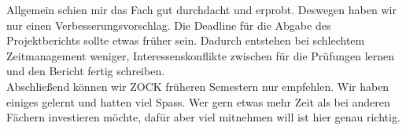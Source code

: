 \documentclass[12pt,a4paper,bibliography=totocnumbered,listof=totocnumbered]{scrartcl}
\begin{document}
	Allgemein schien mir das Fach gut durchdacht und erprobt. Deswegen haben wir nur einen Verbesserungsvorschlag. Die Deadline für die Abgabe des Projektberichts sollte etwas früher sein. Dadurch entstehen bei schlechtem Zeitmanagement weniger, Interessenskonflikte zwischen für die Prüfungen lernen und den Bericht fertig schreiben.\\
	Abschließend können wir \glqq ZOCK \grqq{} früheren Semestern nur empfehlen. Wir haben einiges gelernt und hatten viel Spass. Wer gern etwas mehr Zeit als bei anderen Fächern investieren möchte, dafür aber viel mitnehmen will ist hier genau richtig.

    \newpage
\end{document}
